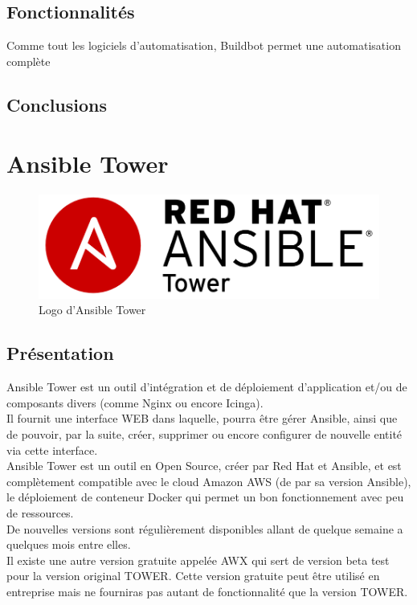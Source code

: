 \documentclass[12pt]{article}
\begin{document}
\subsection{Fonctionnalités}
Comme tout les logiciels d'automatisation, Buildbot permet une automatisation complète 

\subsection{Conclusions}

\section{Ansible Tower}

\begin{figure}[ht]
    \includegraphics[scale=0.4]{images/ansible_tower.png}
    \caption{Logo d'Ansible Tower}
\end{figure}

\subsection{Présentation}
Ansible Tower est un outil d'intégration et de déploiement d'application et/ou de composants divers (comme Nginx ou encore Icinga). 
\\
Il fournit une interface WEB dans laquelle, pourra être gérer Ansible, ainsi que de pouvoir, par la suite, créer, supprimer ou encore configurer de nouvelle entité via cette interface.
\\
Ansible Tower est un outil en Open Source, créer par Red Hat et Ansible, et est complètement compatible avec le cloud Amazon AWS (de par sa version Ansible), le déploiement de conteneur Docker qui permet un bon fonctionnement avec peu de ressources.
\\
De nouvelles versions sont régulièrement disponibles allant de quelque semaine a quelques mois entre elles.
\\
Il existe une autre version gratuite appelée AWX qui sert de version beta test pour la version original TOWER. Cette version gratuite peut être utilisé en entreprise mais ne fourniras pas autant de fonctionnalité que la version TOWER.
\end{document}

